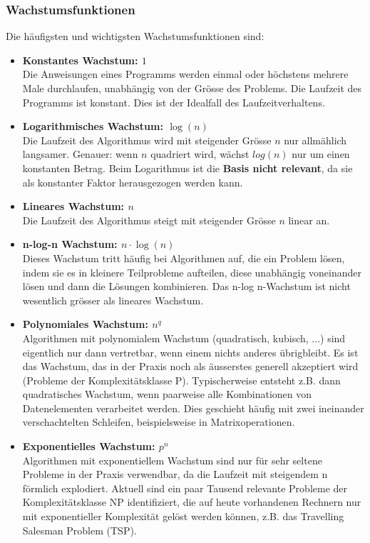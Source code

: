 \subsubsection{Wachstumsfunktionen}
Die häufigsten und wichtigsten Wachstumsfunktionen sind:
\begin{itemize}
\item \textbf{Konstantes Wachstum: $1$}\\
			Die Anweisungen eines Programms werden einmal oder höchstens mehrere Male durchlaufen, unabhängig von der Grösse des Problems. Die Laufzeit des Programms ist konstant. Dies ist der Idealfall des Laufzeitverhaltens.
\item \textbf{Logarithmisches Wachstum: $\log(n)$}\\
			Die Laufzeit des Algorithmus wird mit steigender Grösse $n$ nur allmählich langsamer. Genauer: wenn $n$ quadriert wird, wächst $log(n)$ nur um einen konstanten Betrag. Beim Logarithmus ist die \textbf{Basis nicht relevant}, da sie als konstanter Faktor herausgezogen werden kann.
\item \textbf{Lineares Wachstum: $n$}\\
			Die Laufzeit des Algorithmus steigt mit steigender Grösse $n$ linear an.
\item \textbf{n-log-n Wachstum: $n\cdot \log(n)$}\\
			Dieses Wachstum tritt häufig bei Algorithmen auf, die ein Problem lösen, indem sie es in kleinere Teilprobleme aufteilen, diese unabhängig voneinander lösen und dann die Lösungen kombinieren. Das n-log n-Wachstum ist nicht wesentlich grösser als lineares Wachstum.
\item \textbf{Polynomiales Wachstum: $n^q$}\\
			Algorithmen mit polynomialem Wachstum (quadratisch, kubisch, ...) sind eigentlich nur dann vertretbar, wenn einem nichts anderes übrigbleibt. Es ist das Wachstum, das in der Praxis noch als äusserstes generell akzeptiert wird (Probleme der Komplexitätsklasse P). Typischerweise entsteht z.B. dann quadratisches Wachstum, wenn paarweise alle Kombinationen von Datenelementen verarbeitet werden. Dies geschieht häufig mit zwei ineinander verschachtelten Schleifen, beispielsweise in Matrixoperationen.
\item \textbf{Exponentielles Wachstum: $p^n$}\\
			Algorithmen mit exponentiellem Wachstum sind nur für sehr seltene Probleme in der Praxis verwendbar, da die Laufzeit mit steigendem n förmlich explodiert. Aktuell sind ein paar Tausend relevante Probleme der Komplexitätsklasse NP identifiziert, die auf heute vorhandenen Rechnern nur mit exponentieller Komplexität gelöst werden können, z.B. das Travelling Salesman Problem (TSP).
\end{itemize}
